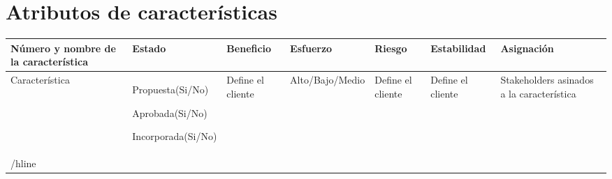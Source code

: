 \chapter{Atributos de características}

\begin{tabular}{|p{2cm}|p{2cm}|p{2cm}|p{2cm}|p{2cm}|p{2cm}|p{2cm}|}
    \hline \textbf{Número y nombre de la característica} & \textbf{Estado} & \textbf{Beneficio} & \textbf{Esfuerzo} & \textbf{Riesgo} & \textbf{Estabilidad} & \textbf{Asignación} \\
    \hline Característica & Propuesta(Si/No) \par Aprobada(Si/No) \par Incorporada(Si/No) & Define el cliente & Alto/Bajo/Medio & Define el cliente & Define el cliente & Stakeholders asinados a la característica \\
    /hline & & & & & & \\
    \hline
\end{tabular}
